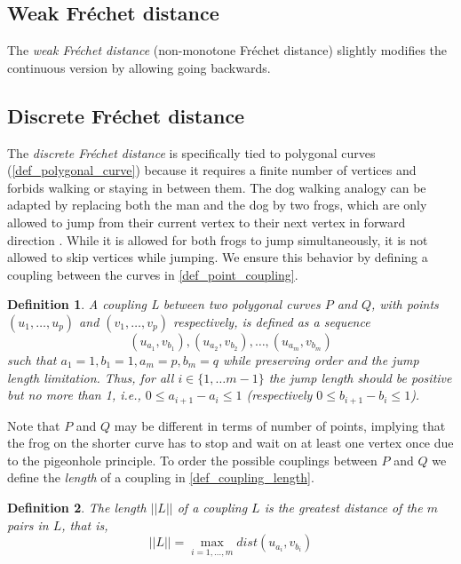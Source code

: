 \documentclass[
oneside,
fontsize=11pt
]{scrartcl}
\newtheorem{mydef}{Definition}
\begin{document}
\subsection{Weak Fréchet distance}
The \textit{weak Fréchet distance} (non-monotone Fréchet distance) slightly modifies the continuous version by allowing 
going backwards. 

\subsection{Discrete Fréchet distance}
The \textit{discrete Fréchet distance} is specifically tied to 
polygonal curves (\autoref{def_polygonal_curve}) 
because it requires a finite number of vertices 
and forbids walking or staying in between them.
The dog walking analogy can be adapted by replacing both the man and the dog by two frogs,
which are only allowed to jump from their current vertex to their next 
vertex in forward direction \cite{bringmann_why_2014}.
While it is allowed for both frogs to jump simultaneously,
it is not allowed to skip vertices while jumping. 
We ensure this behavior by defining a coupling between the curves in \autoref{def_point_coupling}.

\begin{mydef}
  \label{def_point_coupling}
  A \textit{coupling} L between two polygonal curves $P$ and $Q$, 
  with points $(u_1, \dots, u_p)$ and $(v_1, \dots, v_p)$ respectively, 
  is defined as a sequence
  $$(u_{a_1}, v_{b_1}),(u_{a_2}, v_{b_2}), \dots, (u_{a_m}, v_{b_m})$$
  such that $a_1 = 1, b_1 = 1, a_m = p, b_m = q$ 
  while preserving order and the jump length limitation.
  Thus, for all $i \in \{1, \dots m-1\}$
  the jump length should be positive but no more than 1,
  i.e., $0 \leq a_{i+1} - a_i \leq 1$ (respectively $0 \leq b_{i+1} - b_i \leq 1$).
\end{mydef}

Note that $P$ and $Q$ may be different in terms of number of points,
implying that the frog on the shorter curve 
has to stop and wait on at least one vertex once
due to the pigeonhole principle.
To order the possible couplings between $P$ and $Q$ we define the 
\textit{length} of a coupling in \autoref{def_coupling_length}. 

\begin{mydef}
  \label{def_coupling_length}
  The \textit{length} $||L||$ of a coupling $L$ is the greatest distance of the $m$ pairs in $L$, that is, 
  $$||L|| = \max_{i=1, \dots, m} dist(u_{a_i}, v_{b_i})$$
\end{mydef}
\end{document}
